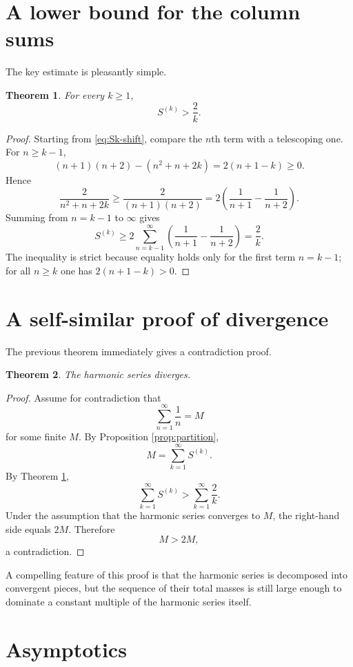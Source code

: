 \documentclass{article}
\theoremstyle{theorem}
\newtheorem{theorem}{Theorem}
\theoremstyle{definition}
\begin{document}
\section{A lower bound for the column sums}

The key estimate is pleasantly simple.

\begin{theorem}\label{thm:lowerbound}
For every $k \ge 1$,
\[
S^{(k)} > \frac{2}{k}.
\]
\end{theorem}

\begin{proof}
Starting from \eqref{eq:Sk-shift}, compare the $n$th term with a telescoping one. For $n \ge k-1$,
\[
(n+1)(n+2) - (n^2+n+2k) = 2(n+1-k) \ge 0.
\]
Hence
\[
\frac{2}{n^2+n+2k} \ge \frac{2}{(n+1)(n+2)} = 2\left(\frac{1}{n+1}-\frac{1}{n+2}\right).
\]
Summing from $n=k-1$ to $\infty$ gives
\[
S^{(k)} \ge 2\sum_{n=k-1}^{\infty} \left(\frac{1}{n+1}-\frac{1}{n+2}\right)=\frac{2}{k}.
\]
The inequality is strict because equality holds only for the first term $n=k-1$; for all $n \ge k$ one has $2(n+1-k)>0$.
\end{proof}

\section{A self-similar proof of divergence}

The previous theorem immediately gives a contradiction proof.

\begin{theorem}\label{thm:divergence}
The harmonic series diverges.
\end{theorem}

\begin{proof}
Assume for contradiction that
\[
\sum_{n=1}^{\infty} \frac{1}{n} = M
\]
for some finite $M$. By Proposition \ref{prop:partition},
\[
M = \sum_{k=1}^{\infty} S^{(k)}.
\]
By Theorem \ref{thm:lowerbound},
\[
\sum_{k=1}^{\infty} S^{(k)} > \sum_{k=1}^{\infty} \frac{2}{k}.
\]
Under the assumption that the harmonic series converges to $M$, the right-hand side equals $2M$. Therefore
\[
M > 2M,
\]
a contradiction.
\end{proof}

A compelling feature of this proof is that the harmonic series is decomposed into convergent pieces, but the sequence of their total masses is still large enough to dominate a constant multiple of the harmonic series itself.

\section{Asymptotics}
\end{document}

